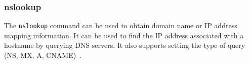 \subsubsection{nslookup}
The \texttt{nslookup} command can be used to obtain domain name or IP address
mapping information. It can be used to find the IP address associated with a
hostname by querying DNS servers. It also supports setting the type of query
(NS, MX, A, CNAME)~\cite{microsoft:nslookup}.

%
%


%
%

